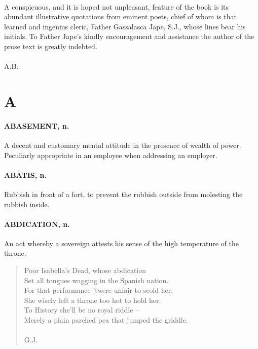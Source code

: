 \documentclass[11pt]{article}
\begin{document}
\paragraph{}
A conspicuous, and it is hoped not unpleasant, feature of the book
is its abundant illustrative quotations from eminent poets, chief of
whom is that learned and ingenius cleric, Father Gassalasca Jape,
S.J., whose lines bear his initials.  To Father Jape's kindly
encouragement and assistance the author of the prose text is greatly
indebted.

\paragraph{}
A.B.


\newpage



\section*{A}

\paragraph{ABASEMENT, n.}  A decent and customary mental attitude in the presence
of wealth of power.  Peculiarly appropriate in an employee when
addressing an employer.

\paragraph{ABATIS, n.}  Rubbish in front of a fort, to prevent the rubbish outside
from molesting the rubbish inside.

\paragraph{ABDICATION, n.}  An act whereby a sovereign attests his sense of the
high temperature of the throne.

\begin{quote}   Poor Isabella's Dead, whose abdication \\
  Set all tongues wagging in the Spanish nation. \\
  For that performance 'twere unfair to scold her: \\
  She wisely left a throne too hot to hold her. \\
  To History she'll be no royal riddle -- \\
  Merely a plain parched pea that jumped the griddle. \\
 \\
G.J. \end{quote}
\end{document}
